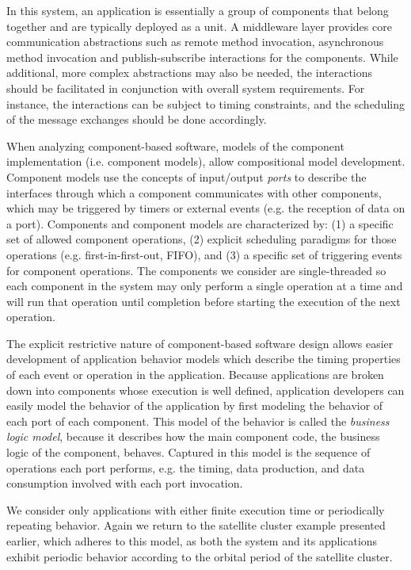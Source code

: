In this system, an application is essentially a group of components
that belong together and are typically deployed as a unit. A
middleware layer provides core communication abstractions such as
remote method invocation, asynchronous method invocation and
publish-subscribe interactions for the components. While additional,
more complex abstractions may also be needed, the interactions should
be facilitated in conjunction with overall system requirements. For
instance, the interactions can be subject to timing constraints, and
the scheduling of the message exchanges should be done accordingly.

When analyzing component-based software, models of the component
implementation (i.e. component models), allow compositional model
development.  Component models use the concepts of input/output
\emph{ports} to describe the interfaces through which a component
communicates with other components, which may be triggered by timers
or external events (e.g. the reception of data on a port).  Components
and component models are characterized by: (1) a specific set of
allowed component operations, (2) explicit scheduling paradigms for
those operations (e.g. first-in-first-out, FIFO), and (3) a specific
set of triggering events for component operations.  The components we
consider are single-threaded so each component in the system may only
perform a single operation at a time and will run that operation until
completion before starting the execution of the next operation.

The explicit restrictive nature of component-based software design
allows easier development of application behavior models which
describe the timing properties of each event or operation in the
application.  Because applications are broken down into components
whose execution is well defined, application developers can easily
model the behavior of the application by first modeling the behavior
of each port of each component.  This model of the behavior is called
the \textit{business logic model}, because it describes how the main
component code, the business logic of the component, behaves.
Captured in this model is the sequence of operations each port
performs, e.g. the timing, data production, and data consumption
involved with each port invocation.

We consider only applications with either finite execution time or
periodically repeating behavior.  Again we return to the satellite
cluster example presented earlier, which adheres to this model, as
both the system and its applications exhibit periodic behavior
according to the orbital period of the satellite cluster.

